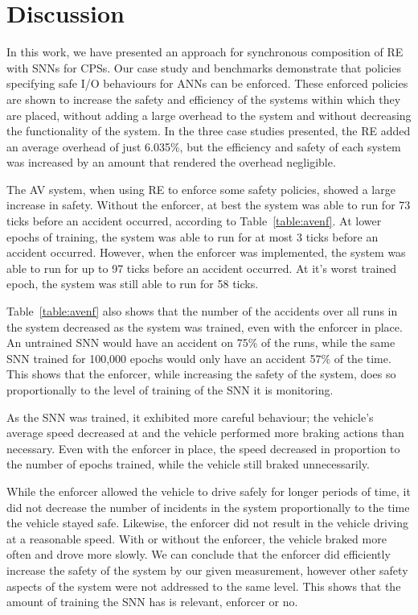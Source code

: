 \section{Discussion}
\label{sec:conclusion}

In this work, we have presented an approach for synchronous composition of \acf{RE} with \acfp{SNN} for \acp{CPS}.
Our case study and benchmarks demonstrate that policies specifying safe I/O behaviours for \acp{ANN} can be enforced.
These enforced policies are shown to increase the safety and efficiency of the systems within which they are placed, without adding a large overhead to the system and without decreasing the functionality of the system.
In the three case studies presented, the \ac{RE} added an average overhead of just 6.035\%, but the efficiency and safety of each system was increased by an amount that rendered the overhead negligible.

The \ac{AV} system, when using \ac{RE} to enforce some safety policies, showed a large increase in safety.
Without the enforcer, at best the system was able to run for 73 ticks before an accident occurred, according to Table~\ref{table:avenf}.
At lower epochs of training, the system was able to run for at most 3 ticks before an accident occurred.
However, when the enforcer was implemented, the system was able to run for up to 97 ticks before an accident occurred.
At it's worst trained epoch, the system was still able to run for 58 ticks.

Table~\ref{table:avenf} also shows that the number of the accidents over all runs in the system decreased as the system was trained, even with the enforcer in place.
An untrained \ac{SNN} would have an accident on 75\% of the runs, while the same \ac{SNN} trained for 100,000 epochs would only have an accident 57\% of the time.
This shows that the enforcer, while increasing the safety of the system, does so proportionally to the level of training of the \ac{SNN} it is monitoring.

As the \ac{SNN} was trained, it exhibited more careful behaviour; the vehicle's average speed decreased at and the vehicle performed more braking actions than necessary.
Even with the enforcer in place, the speed decreased in proportion to the number of epochs trained, while the vehicle still braked unnecessarily.

While the enforcer allowed the vehicle to drive safely for longer periods of time, it did not decrease the number of incidents in the system proportionally to the time the vehicle stayed safe.
Likewise, the enforcer did not result in the vehicle driving at a reasonable speed.
With or without the enforcer, the vehicle braked more often and drove more slowly.
We can conclude that the enforcer did efficiently increase the safety of the system by our given measurement, however other safety aspects of the system were not addressed to the same level.
This shows that the amount of training the \ac{SNN} has is relevant, enforcer or no.

